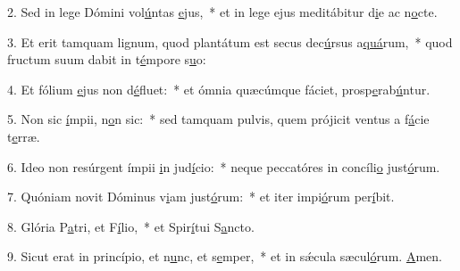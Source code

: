 2. Sed in lege Dómini vol\uline{ú}ntas \uline{e}jus,~* et in lege ejus meditábitur d\uline{i}e ac n\uline{o}cte.\par 
3. Et erit tamquam lignum, quod plantátum est secus dec\uline{ú}rsus a\uline{quá}rum,~* quod fructum suum dabit in t\uline{é}mpore s\uline{u}o:\par 
4. Et fólium \uline{e}jus non d\uline{é}fluet:~* et ómnia quæcúmque fáciet, prosp\uline{e}rab\uline{ú}ntur.\par 
5. Non sic \uline{í}mpii, n\uline{o}n sic:~* sed tamquam pulvis, quem prójicit ventus a f\uline{á}cie t\uline{e}rræ.\par 
6. Ideo non resúrgent ímpii \uline{i}n jud\uline{í}cio:~* neque peccatóres in concíli\uline{o} just\uline{ó}rum.\par 
7. Quóniam novit Dóminus v\uline{i}am just\uline{ó}rum:~* et iter impi\uline{ó}rum per\uline{í}bit.\par 
8. Glória P\uline{a}tri, et F\uline{í}lio,~* et Spir\uline{í}tui S\uline{a}ncto.\par 
9. Sicut erat in princípio, et n\uline{u}nc, et s\uline{e}mper,~* et in sǽcula sæcul\uline{ó}rum. \uline{A}men.\par 
